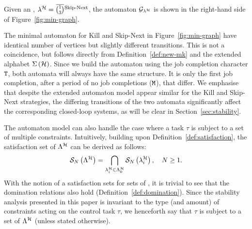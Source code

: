 \begin{example}%
    \label{ex:auto-skip}%
    Given an \ewhc{}, $\lambda^{\strat} = \overbar{\binom{1}{3}}^{\text{Skip-Next}}$, the automaton $\mathcal{G}_{\lambda^{\mathcal{H}}}$ is shown in the right-hand side of Figure~\ref{fig:min-graph}.
\end{example}

The minimal automaton for Kill and Skip-Next in Figure~\ref{fig:min-graph} have identical number of vertices but slightly different transitions.
This is not a coincidence, but follows directly from Definition~\ref{def:new-mk} and the extended alphabet $\Sigma\left(\mathcal{H}\right)$.
Since we build the automaton using the job completion character $\texttt{T}$, both automata will always have the same structure.
It is only the first job completion, after a period of no job completions ($\texttt{M}$), that differ.
We emphasise that despite the extended automaton model appear similar for the Kill and Skip-Next strategies, the differing transitions of the two automata significantly affect the corresponding closed-loop systems, as will be clear in Section~\ref{sec:stability}.

The \tool{} automaton model can also handle the case where a task $\tau$ is subject to a set of multiple constraints.
Intuitively, building upon Definition~\ref{def:satisfaction}, the satisfaction set of $\Lambda^{\mathcal{H}}$ can be derived as follows:
%
\begin{equation}
    \label{eq:satisfaction-multi}
    \sset{N}{\Lambda^{\strat}} = \bigcap_{\lambda^{\strat}_i \in \Lambda^{\strat}_0} \sset{N}{\lambda^{\strat}_i}, \quad N \geq 1.
\end{equation}
%
With the notion of a satisfaction sets for sets of \ewhc{}, it is trivial to see that the domination relations also hold (Definition~\ref{def:domination}).
Since the stability analysis presented in this paper is invariant to the type (and amount) of constraints acting on the control task $\tau$, we henceforth say that $\tau$ is subject to a set of \ewhc{} $\Lambda^{\mathcal{H}}$ (unless stated otherwise).



